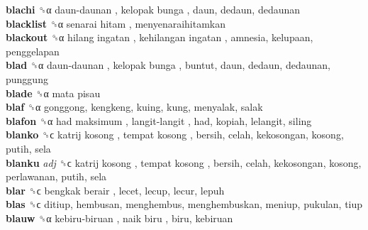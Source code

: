 \textbf{blachi} ␝α   daun-daunan ,  kelopak bunga , daun, dedaun, dedaunan  \\
\textbf{blacklist} ␝α   senarai hitam , menyenaraihitamkan  \\
\textbf{blackout} ␝α   hilang ingatan ,  kehilangan ingatan , amnesia, kelupaan, penggelapan  \\
\textbf{blad} ␝α   daun-daunan ,  kelopak bunga , buntut, daun, dedaun, dedaunan, punggung  \\
\textbf{blade} ␝α   mata pisau   \\
\textbf{blaf} ␝α  gonggong, kengkeng, kuing, kung, menyalak, salak  \\
\textbf{blafon} ␝α   had maksimum ,  langit-langit , had, kopiah, lelangit, siling  \\
\textbf{blanko} ␝ϲ   katrij kosong ,  tempat kosong , bersih, celah, kekosongan, kosong, putih, sela  \\
\textbf{blanku} \emph{adj}  ␝ϲ   katrij kosong ,  tempat kosong , bersih, celah, kekosongan, kosong, perlawanan, putih, sela  \\
\textbf{blar} ␝ϲ   bengkak berair , lecet, lecup, lecur, lepuh  \\
\textbf{blas} ␝ϲ  ditiup, hembusan, menghembus, menghembuskan, meniup, pukulan, tiup  \\
\textbf{blauw} ␝α   kebiru-biruan ,  naik biru , biru, kebiruan  \\
